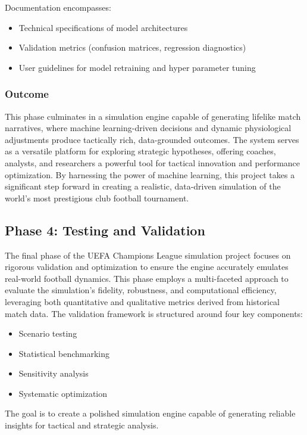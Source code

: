\documentclass[12pt]{article}
\begin{document}
Documentation encompasses:
\begin{itemize}
    \item Technical specifications of model architectures
    \item Validation metrics (confusion matrices, regression diagnostics)
    \item User guidelines for model retraining and hyper parameter tuning
\end{itemize}

\subsubsection{Outcome}
This phase culminates in a simulation engine capable of generating lifelike match narratives, where machine learning-driven decisions and dynamic physiological adjustments produce tactically rich, data-grounded outcomes. The system serves as a versatile platform for exploring strategic hypotheses, offering coaches, analysts, and researchers a powerful tool for tactical innovation and performance optimization. By harnessing the power of machine learning, this project takes a significant step forward in creating a realistic, data-driven simulation of the world's most prestigious club football tournament.

\subsection{Phase 4: Testing and Validation}
The final phase of the UEFA Champions League simulation project focuses on rigorous validation and optimization to ensure the engine accurately emulates real-world football dynamics. This phase employs a multi-faceted approach to evaluate the simulation's fidelity, robustness, and computational efficiency, leveraging both quantitative and qualitative metrics derived from historical match data. The validation framework is structured around four key components:

\begin{itemize}
    \item Scenario testing
    \item Statistical benchmarking
    \item Sensitivity analysis
    \item Systematic optimization
\end{itemize}

The goal is to create a polished simulation engine capable of generating reliable insights for tactical and strategic analysis.
\end{document}
